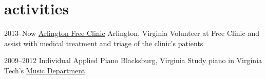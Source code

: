 \documentclass[]{friggeri-cv}
\begin{document}

\section{activities}

\begin{entrylist}

\entry
{2013--Now}
{\href{http://www.arlingtonfreeclinic.org}{Arlington Free Clinic}}
{Arlington, Virginia}
{Volunteer at Free Clinic and assist with medical treatment and triage of the clinic's patients}

\entry
{2009--2012}
{Individual Applied Piano}
{Blacksburg, Virginia}
{Study piano in Virginia Tech's \href{http://www.music.vt.edu/}{Music Department}}
\end{entrylist}
\end{document}
